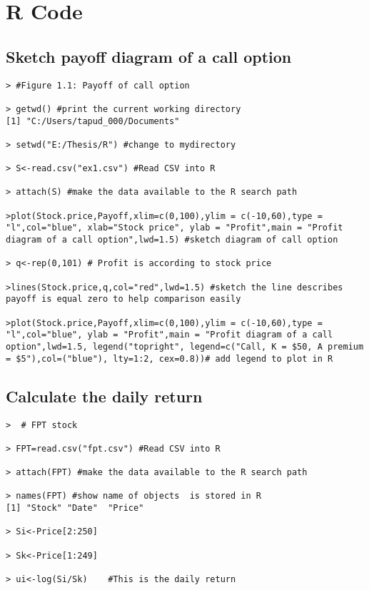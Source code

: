 \chapter{R Code}

\section{Sketch payoff diagram of a call option}
\begin{lstlisting}
> #Figure 1.1: Payoff of call option 

> getwd() #print the current working directory
[1] "C:/Users/tapud_000/Documents"

> setwd("E:/Thesis/R") #change to mydirectory

> S<-read.csv("ex1.csv") #Read CSV into R 

> attach(S) #make the data available to the R search path

>plot(Stock.price,Payoff,xlim=c(0,100),ylim = c(-10,60),type = "l",col="blue", xlab="Stock price", ylab = "Profit",main = "Profit diagram of a call option",lwd=1.5) #sketch diagram of call option

> q<-rep(0,101) # Profit is according to stock price

>lines(Stock.price,q,col="red",lwd=1.5) #sketch the line describes payoff is equal zero to help comparison easily

>plot(Stock.price,Payoff,xlim=c(0,100),ylim = c(-10,60),type = "l",col="blue", ylab = "Profit",main = "Profit diagram of a call option",lwd=1.5, legend("topright", legend=c("Call, K = $50, A premium = $5"),col=("blue"), lty=1:2, cex=0.8))# add legend to plot in R
\end{lstlisting}

\newpage
\section{Calculate the daily return}
\begin{lstlisting}
>  # FPT stock

> FPT=read.csv("fpt.csv") #Read CSV into R 

> attach(FPT) #make the data available to the R search path

> names(FPT) #show name of objects  is stored in R
[1] "Stock" "Date"  "Price"

> Si<-Price[2:250]	

> Sk<-Price[1:249]	

> ui<-log(Si/Sk)	#This is the daily return

\end{lstlisting}

